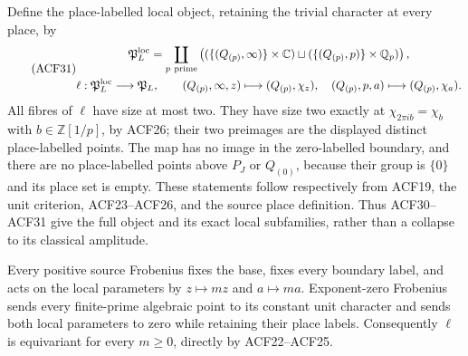Define the place-labelled local object, retaining the trivial character
at every place, by
\begin{equation}\tag{ACF31}
 \begin{gathered}
 \mathfrak P_L^{\rm loc}=
 \coprod_{p\ \mathrm{prime}}
 \left((\{(Q_{(p)},\infty)\}\times\mathbb C)
       \sqcup(\{(Q_{(p)},p)\}\times\mathbb Q_p)\right),\\
 \ell:\mathfrak P_L^{\rm loc}\longrightarrow\mathfrak P_L,\qquad
 (Q_{(p)},\infty,z)\longmapsto(Q_{(p)},\chi_z),\quad
 (Q_{(p)},p,a)\longmapsto(Q_{(p)},\chi_a).
 \end{gathered}
\end{equation}
All fibres of $\ell$ have size at most two. They have size two exactly
at $\chi_{2\pi i b}=\chi_b$ with $b\in\mathbb Z[1/p]$, by ACF26;
their two preimages are the displayed distinct place-labelled points.
The map has no image in the zero-labelled boundary, and there are no
place-labelled points above $P_J$ or $Q_{(0)}$, because their group is
$\{0\}$ and its place set is empty. These statements follow respectively
from ACF19, the unit criterion, ACF23--ACF26, and the source place
definition. Thus ACF30--ACF31 give the full object and its exact local
subfamilies, rather than a collapse to its classical amplitude.

Every positive source Frobenius fixes the base, fixes every boundary
label, and acts on the local parameters by $z\mapsto mz$ and
$a\mapsto ma$. Exponent-zero Frobenius sends every finite-prime
algebraic point to its constant unit character and sends both local
parameters to zero while retaining their place labels. Consequently
$\ell$ is equivariant for every $m\ge0$, directly by ACF22--ACF25.
